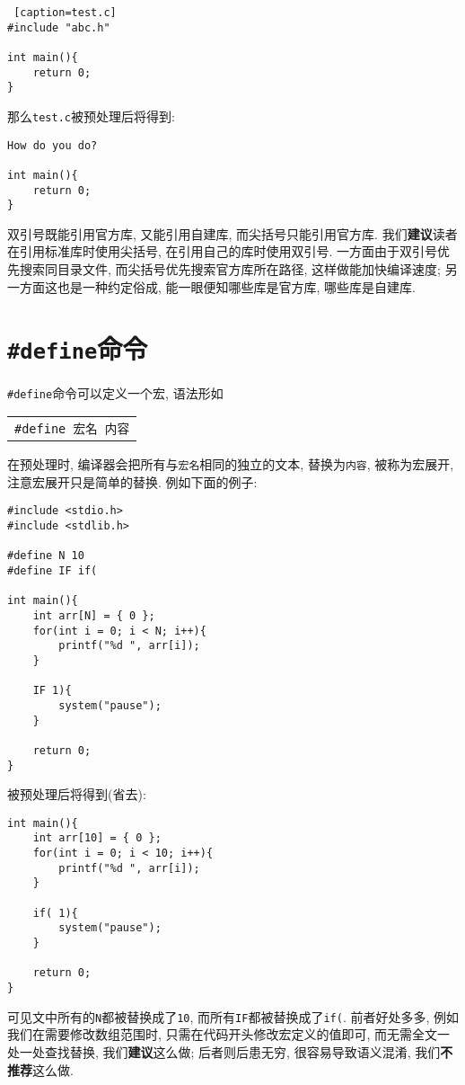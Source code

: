 \begin{lstlisting} [caption=test.c]
#include "abc.h"

int main(){
    return 0;
}
\end{lstlisting}

        那么\texttt{test.c}被预处理后将得到:
\begin{lstlisting}
How do you do?

int main(){
    return 0;
}
\end{lstlisting}

        双引号既能引用官方库, 又能引用自建库, 而尖括号只能引用官方库. 我们\textbf{建议}读者在引用标准库时使用尖括号, 在引用自己的库时使用双引号. 一方面由于双引号优先搜索同目录文件, 而尖括号优先搜索官方库所在路径, 这样做能加快编译速度; 另一方面这也是一种约定俗成, 能一眼便知哪些库是官方库, 哪些库是自建库.

    \section{\texttt{\#define}命令}
        \texttt{\#define}命令可以定义一个宏, 语法形如
        \begin{center}
        \begin{longtable}{l}
            \texttt{\#define 宏名~内容}
        \end{longtable}
        \end{center}

        在预处理时, 编译器会把所有与\texttt{宏名}相同的独立的文本, 替换为\texttt{内容}, 被称为宏展开, 注意宏展开只是简单的替换. 例如下面的例子:
\begin{lstlisting}
#include <stdio.h>
#include <stdlib.h>

#define N 10
#define IF if(

int main(){
    int arr[N] = { 0 };
    for(int i = 0; i < N; i++){
        printf("%d ", arr[i]);
    }

    IF 1){
        system("pause");
    }

    return 0;
}
\end{lstlisting}
        被预处理后将得到(省去):
\begin{lstlisting}
int main(){
    int arr[10] = { 0 };
    for(int i = 0; i < 10; i++){
        printf("%d ", arr[i]);
    }

    if( 1){
        system("pause");
    }

    return 0;
}
\end{lstlisting}

        可见文中所有的\texttt{N}都被替换成了\texttt{10}, 而所有\texttt{IF}都被替换成了\texttt{if(}. 前者好处多多, 例如我们在需要修改数组范围时, 只需在代码开头修改宏定义的值即可, 而无需全文一处一处查找替换, 我们\textbf{建议}这么做; 后者则后患无穷, 很容易导致语义混淆, 我们\textbf{不推荐}这么做.

